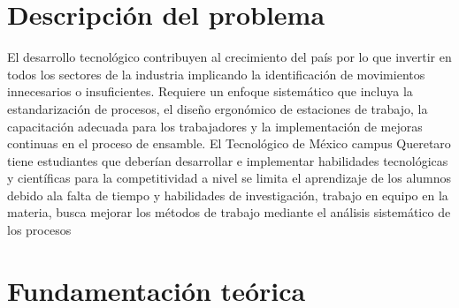     \section{Descripción del problema}
    
     El desarrollo tecnológico contribuyen al crecimiento del país por lo que invertir en todos los sectores de la industria  implicando  la  identificación de movimientos innecesarios o insuficientes. Requiere un enfoque sistemático que incluya la estandarización de procesos, el diseño ergonómico de estaciones de trabajo, la capacitación adecuada para los trabajadores y la implementación de mejoras continuas en el proceso de ensamble.
    El Tecnológico de México campus Queretaro tiene estudiantes que deberían desarrollar e implementar habilidades tecnológicas y científicas para la competitividad a nivel
    se limita el aprendizaje de los alumnos debido ala falta de tiempo y habilidades de investigación, trabajo en equipo  en la materia, busca mejorar los métodos de trabajo mediante el análisis sistemático de los procesos 
    \section{Fundamentación teórica}
    

